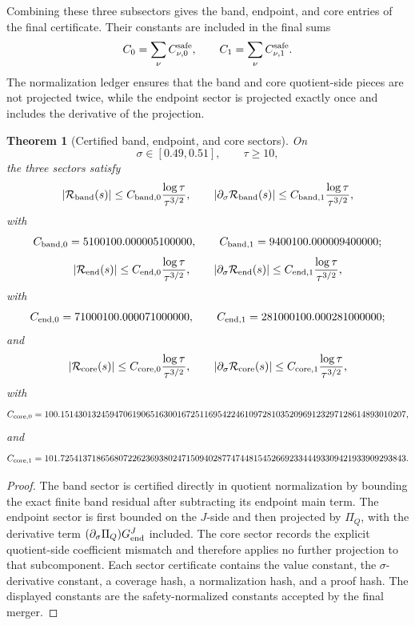\documentclass[11pt]{article}
\newtheorem{theorem}{Theorem}[section]
\newcommand{\s}{s}
\newcommand{\sig}{\sigma}
\newcommand{\tauh}{\tau}
\newcommand{\Rband}{\mathcal R_{\rm band}}
\newcommand{\Rend}{\mathcal R_{\rm end}}
\newcommand{\Rcore}{\mathcal R_{\rm core}}
\newcommand{\PiQ}{\Pi_Q}
\newcommand{\Czero}{C_0}
\newcommand{\Cone}{C_1}
\begin{document}
Combining these three subsectors gives the band, endpoint, and core entries of
the final certificate.  Their constants are included in the final sums
\[
        \Czero=\sum_\nu C_{\nu,0}^{\rm safe},
        \qquad
        \Cone=\sum_\nu C_{\nu,1}^{\rm safe}.
\]
The normalization ledger ensures that the band and core quotient-side pieces
are not projected twice, while the endpoint sector is projected exactly once
and includes the derivative of the projection.

\begin{theorem}[Certified band, endpoint, and core sectors]
On
\[
        \sig\in[0.49,0.51],
        \qquad
        \tauh\ge10,
\]
the three sectors satisfy
\[
        |\Rband(\s)|
        \le
        C_{{\rm band},0}
        \frac{\log\tauh}{\tauh^{3/2}},
        \qquad
        |\partial_\sig\Rband(\s)|
        \le
        C_{{\rm band},1}
        \frac{\log\tauh}{\tauh^{3/2}},
\]
with
\[
        C_{{\rm band},0}=5100100.000005100000,
        \qquad
        C_{{\rm band},1}=9400100.000009400000;
\]
\[
        |\Rend(\s)|
        \le
        C_{{\rm end},0}
        \frac{\log\tauh}{\tauh^{3/2}},
        \qquad
        |\partial_\sig\Rend(\s)|
        \le
        C_{{\rm end},1}
        \frac{\log\tauh}{\tauh^{3/2}},
\]
with
\[
        C_{{\rm end},0}=71000100.000071000000,
        \qquad
        C_{{\rm end},1}=281000100.000281000000;
\]
and
\[
        |\Rcore(\s)|
        \le
        C_{{\rm core},0}
        \frac{\log\tauh}{\tauh^{3/2}},
        \qquad
        |\partial_\sig\Rcore(\s)|
        \le
        C_{{\rm core},1}
        \frac{\log\tauh}{\tauh^{3/2}},
\]
with
\[
        C_{{\rm core},0}
        =
        100.15143013245947061906516300167251169542246109728103520969123297128614893010207,
\]
and
\[
        C_{{\rm core},1}
        =
        101.72541371865680722623693802471509402877474481545266923344493309421933909293843.
\]
\end{theorem}

\begin{proof}
The band sector is certified directly in quotient normalization by bounding
the exact finite band residual after subtracting its endpoint main term.  The
endpoint sector is first bounded on the \(J\)-side and then projected by
\(\PiQ\), with the derivative term
\((\partial_\sig\PiQ)G_{\rm end}^{J}\) included.  The core sector records the
explicit quotient-side coefficient mismatch and therefore applies no further
projection to that subcomponent.  Each sector certificate contains the value
constant, the \(\sig\)-derivative constant, a coverage hash, a normalization
hash, and a proof hash.  The displayed constants are the safety-normalized
constants accepted by the final merger.
\end{proof}
\end{document}
